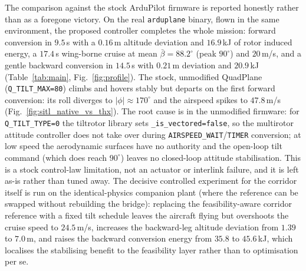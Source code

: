 \documentclass[preprint,3p,11pt]{elsarticle}
\begin{document}
The comparison against the stock ArduPilot firmware is reported honestly rather
than as a foregone victory. On the real \texttt{arduplane} binary, flown in the
same environment, the proposed controller completes the whole mission: forward
conversion in $9.5$\,s with a $0.16$\,m altitude deviation and $16.9$\,kJ of
rotor induced energy, a $17.4$\,s wing-borne cruise at mean
$\bar\beta=88.2^\circ$ (peak $90^\circ$) and $20$\,m/s, and a gentle backward
conversion in $14.5$\,s with $0.21$\,m deviation and $20.9$\,kJ
(Table~\ref{tab:main}, Fig.~\ref{fig:profile}). The stock, unmodified
QuadPlane (\texttt{Q\_TILT\_MAX=80}) climbs and hovers stably but departs on
the first forward conversion: its roll diverges to $|\phi|\approx170^\circ$ and
the airspeed spikes to $47.8$\,m/s (Fig.~\ref{fig:sitl_native_vs_thx}). The
root cause is in the unmodified firmware: for \texttt{Q\_TILT\_TYPE=0} the
tiltrotor library sets \texttt{\_is\_vectored=false}, so the multirotor attitude
controller does not take over during \texttt{AIRSPEED\_WAIT}/\texttt{TIMER}
conversion; at low speed the aerodynamic surfaces have no authority and the
open-loop tilt command (which does reach $90^\circ$) leaves no closed-loop
attitude stabilisation. This is a stock control-law limitation, not an actuator
or interlink failure, and it is left as-is rather than tuned away.
The decisive controlled experiment for the corridor itself is run on the
identical-physics companion plant (where the reference can be swapped without
rebuilding the bridge): replacing the feasibility-aware corridor reference with
a fixed tilt schedule leaves the aircraft flying but overshoots the cruise speed
to $24.5$\,m/s, increases the backward-leg altitude deviation from $1.39$ to
$7.0$\,m, and raises the backward conversion energy from $35.8$ to $45.6$\,kJ,
which localises the stabilising benefit to the feasibility layer rather than to
optimisation per se.

\end{document}
